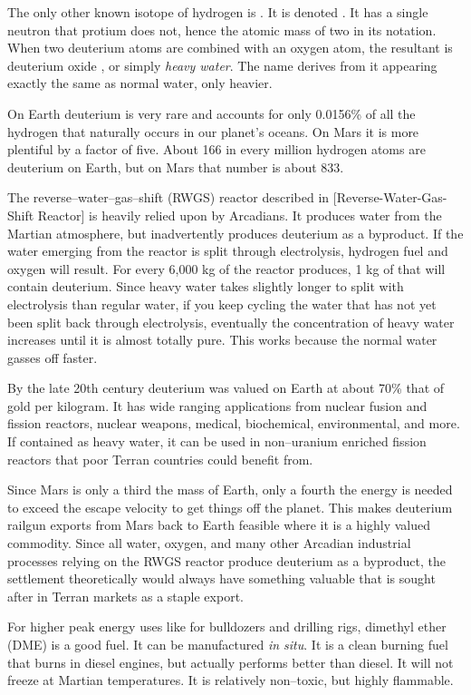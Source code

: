 The only other known isotope of hydrogen is . It is denoted . It has a single neutron that protium does not, hence the atomic mass of two in its notation. When two deuterium atoms are combined with an oxygen atom, the resultant is deuterium oxide , or simply {\it heavy water}. The name derives from it appearing exactly the same as normal water, only heavier.

On Earth deuterium is very rare and accounts for only 0.0156\% of all the hydrogen that naturally occurs in our planet's oceans. On Mars it is more plentiful by a factor of five. About 166 in every million hydrogen atoms are deuterium on Earth, but on Mars that number is about 833. 

The reverse--water--gas--shift (RWGS) reactor described in [Reverse-Water-Gas-Shift Reactor] is heavily relied upon by Arcadians. It produces water from the Martian atmosphere, but inadvertently produces deuterium as a byproduct. If the water emerging from the reactor is split through electrolysis, hydrogen fuel and oxygen will result. For every 6,000 kg of  the reactor produces, 1 kg of that will contain deuterium. Since heavy water takes slightly longer to split with electrolysis than regular water, if you keep cycling the water that has not yet been split back through electrolysis, eventually the concentration of heavy water increases until it is almost totally pure. This works because the normal water gasses off faster.

By the late 20th century deuterium was valued on Earth at about 70\% that of gold per kilogram. It has wide ranging applications from nuclear fusion and fission reactors, nuclear weapons, medical, biochemical, environmental, and more. If contained as heavy water, it can be used in non--uranium enriched fission reactors that poor Terran countries could benefit from.

Since Mars is only a third the mass of Earth, only a fourth the energy is needed to exceed the escape velocity to get things off the planet. This makes deuterium railgun exports from Mars back to Earth feasible where it is a highly valued commodity. Since all water, oxygen, and many other Arcadian industrial processes relying on the RWGS reactor produce deuterium as a byproduct, the settlement theoretically would always have something valuable that is sought after in Terran markets as a staple export.

For higher peak energy uses like for bulldozers and drilling rigs, dimethyl ether  (DME) is a good fuel. It can be manufactured {\it in situ}. It is a clean burning fuel that burns in diesel engines, but actually performs better than diesel. It will not freeze at Martian temperatures. It is relatively non--toxic, but highly flammable.

